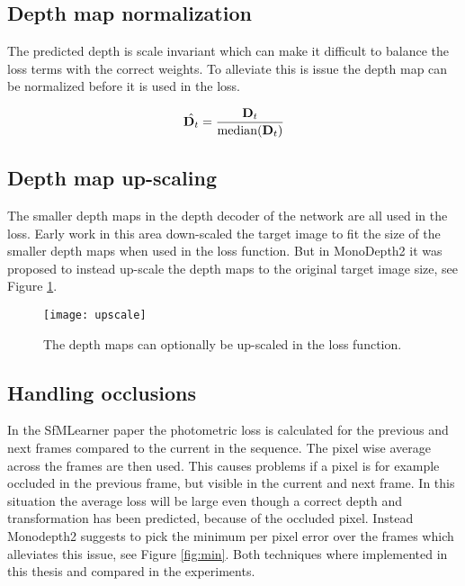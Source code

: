 \subsection{Depth map normalization}\label{sec:normalization}

The predicted depth is scale invariant which can make it difficult to balance the loss terms with the correct weights. To alleviate this is issue the depth map can be normalized before it is used in the loss.

\begin{equation}
\hat{\textbf{D}_t} = \frac{\textbf{D}_t}{\operatorname{median}(\textbf{D}_t)} 
\end{equation}

\subsection{Depth map up-scaling}\label{sec:upscale}

The smaller depth maps in the depth decoder of the network are all used in the loss. Early work in this area down-scaled the target image to fit the size of the smaller depth maps when used in the loss function. But in MonoDepth2\cite{monodepth2} it was proposed to instead up-scale the depth maps to the original target image size, see Figure \ref{fig:upscale}.

\begin{figure}[H]
	\centering
	\texttt{[image: upscale]}
	\caption{The depth maps can optionally be up-scaled in the loss function.}
	\label{fig:upscale}
\end{figure}

\subsection{Handling occlusions}
\label{sec:occlusion}

\iffalse
\paragraph{Disparity loss} To encourage background depths (low disparities) in shadows of the depth map where occlusion has occurred a penalty on the disparity can be added $ \mathcal{L}_{o} =|d_t|. $
\fi

In the SfMLearner paper the photometric loss is calculated for the previous and next frames compared to the current in the sequence. The pixel wise average across the frames are then used. This causes problems if a pixel is for example occluded in the previous frame, but visible in the current and next frame. In this situation the average loss will be large even though a correct depth and transformation has been predicted, because of the occluded pixel. Instead Monodepth2 suggests to pick the minimum per pixel error over the frames which alleviates this issue, see Figure \ref{fig:min}. Both techniques where implemented in this thesis and compared in the experiments.

